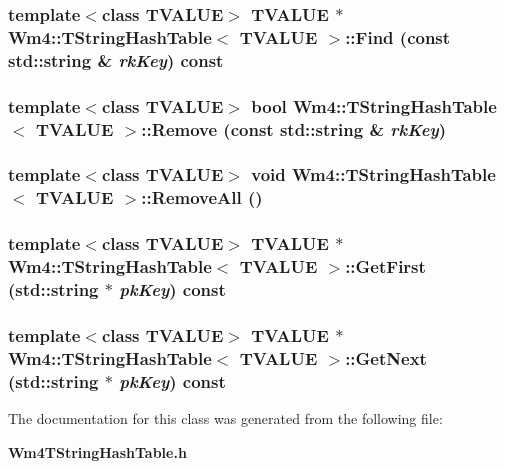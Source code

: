 \subsubsection{\setlength{\rightskip}{0pt plus 5cm}template$<$class TVALUE$>$ TVALUE $\ast$ {\bf Wm4::TString\-Hash\-Table}$<$ TVALUE $>$::Find (const std::string \& {\em rk\-Key}) const}\label{classWm4_1_1TStringHashTable_0655fe1516c18976e0d260cfdbad3db7}


\subsubsection{\setlength{\rightskip}{0pt plus 5cm}template$<$class TVALUE$>$ bool {\bf Wm4::TString\-Hash\-Table}$<$ TVALUE $>$::Remove (const std::string \& {\em rk\-Key})}\label{classWm4_1_1TStringHashTable_7c4c6b2071b30bae479c18a8eaf721dd}


\subsubsection{\setlength{\rightskip}{0pt plus 5cm}template$<$class TVALUE$>$ void {\bf Wm4::TString\-Hash\-Table}$<$ TVALUE $>$::Remove\-All ()}\label{classWm4_1_1TStringHashTable_654fcff20a8e68aa8c2c14577b0c11b4}


\subsubsection{\setlength{\rightskip}{0pt plus 5cm}template$<$class TVALUE$>$ TVALUE $\ast$ {\bf Wm4::TString\-Hash\-Table}$<$ TVALUE $>$::Get\-First (std::string $\ast$ {\em pk\-Key}) const}\label{classWm4_1_1TStringHashTable_728f59068296861d743449d8d357768f}


\subsubsection{\setlength{\rightskip}{0pt plus 5cm}template$<$class TVALUE$>$ TVALUE $\ast$ {\bf Wm4::TString\-Hash\-Table}$<$ TVALUE $>$::Get\-Next (std::string $\ast$ {\em pk\-Key}) const}\label{classWm4_1_1TStringHashTable_0d203a2bd2cdb9fc6189d81d96d73aa2}




The documentation for this class was generated from the following file:\begin{CompactItemize}
\item 
{\bf Wm4TString\-Hash\-Table.h}\end{CompactItemize}
